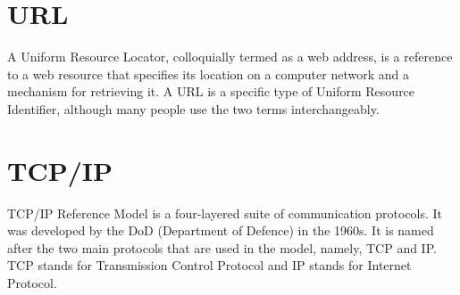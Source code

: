 \documentclass[twocolumn, a4paper]{article}
\begin{document}
\begin{table}[ht]
  \caption{Difference between router and switch}
\end{table}

\section{URL}
A Uniform Resource Locator, colloquially termed as a web address, is a
reference to a web resource that specifies its location on a computer network
and a mechanism for retrieving it. A URL is a specific type of Uniform Resource
Identifier, although many people use the two terms interchangeably.

\section{TCP/IP}
TCP/IP Reference Model is a four-layered suite of communication protocols. It
was developed by the DoD (Department of Defence) in the 1960s. It is named
after the two main protocols that are used in the model, namely, TCP and IP.
TCP stands for Transmission Control Protocol and IP stands for Internet
Protocol.
\end{document}
